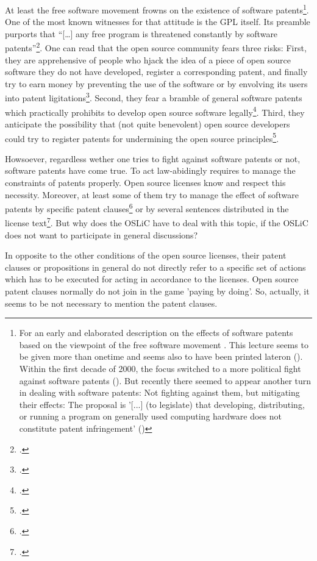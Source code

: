 At least the free software movement frowns on the existence of software
patents\footnote{For an early and elaborated description on the effects of
software patents based on the viewpoint of the free software movement
\cite[see][\nopage wp]{Stallman2001a}. This lecture seems to be given more than
onetime and seems also to have been printed lateron (\cite[cf.][\nopage
wp]{Stallman2002a}). Within the first decade of 2000, the focus switched to a
more political fight against software patents (\cite[cf.][\nopage
wp]{Stallman2004a}). But recently there seemed to appear another turn in dealing
with software patents: Not fighting against them, but mitigating their effects:
The proposal is '[...] (to legislate) that developing, distributing, or running
a program on generally used computing hardware does not constitute patent
infringement' (\cite[cf.][\nopage wp]{Stallman2012a})}. One of the most known
witnesses for that attitude is the GPL itself. Its preamble purports that
\enquote{[\ldots] any free program is threatened constantly by software
patents}\footcite[cf.][wp]{Gpl20OsiLicense1991a}. One can read that the open
source community fears three risks: First, they are apprehensive of people who
hjack the idea of a piece of open source software they do not have developed,
register a corresponding patent, and finally try to earn money by preventing the
use of the software or by envolving its users into patent
ligitations\footcite[cf.][234]{JaeMet2011a}. Second, they fear a bramble of
general software patents which practically prohibits to develop open source
software legally\footcite[cf.][234]{JaeMet2011a}. Third, they anticipate the
possibility that (not quite benevolent) open source developers could try to
register patents for undermining the open source
principles\footcite[cf.][235]{JaeMet2011a}.

Howsoever, regardless wether one tries to fight against software patents or not,
software patents have come true. To act law-abidingly requires to manage the
constraints of patents properly. Open source licenses know and respect this
necessity. Moreover, at least some of them try to manage the effect of software
patents by specific patent clauses\footcite[pars pro toto cf.][\nopage wp.
§3]{Apl20OsiLicense2004a} or by several sentences distributed in the license
text\footcite[pars pro toto cf.][\nopage wp.]{Epl10OsiLicense2005a}. But why
does the OSLiC have to deal with this topic, if the OSLiC does not want to
participate in general discussions?

In opposite to the other conditions of the open source licenses, their patent
clauses or propositions in general do not directly refer to a specific set of
actions which has to be executed for acting in accordance to the licenses. Open
source patent clauses normally do not join in the game 'paying by doing'. So,
actually, it seems to be not necessary to mention the patent clauses.

